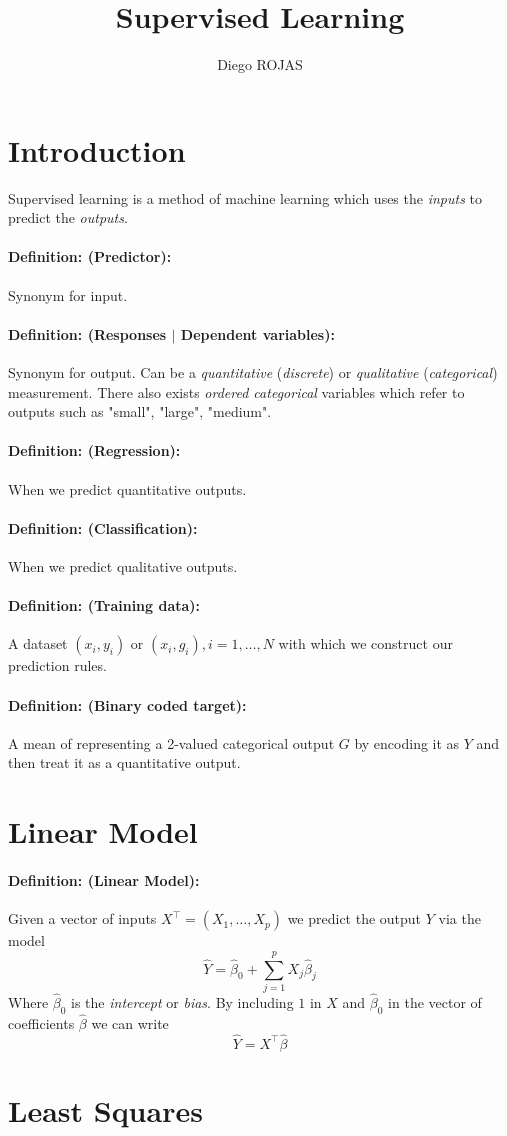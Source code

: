 \documentclass[12pt]{article}
\title{Supervised Learning}
\author{Diego ROJAS}
\newcommand{\xdefinition}[2]{\paragraph{\colorbox{#1!30}{\textbf{Definition:}} (#2):}}
\begin{document}
\maketitle

\section{Introduction}

Supervised learning is a method of machine learning which uses the \textit{inputs} to predict the \textit{outputs}.

\xdefinition{red}{Predictor} Synonym for input.

\xdefinition{red}{Responses $|$ Dependent variables} Synonym for output. Can be a \textit{quantitative} (\textit{discrete}) or \textit{qualitative} (\textit{categorical}) measurement. There also exists \textit{ordered categorical} variables which refer to outputs such as "small", "large", "medium".

\xdefinition{red}{Regression} When we predict quantitative outputs.

\xdefinition{red}{Classification} When we predict qualitative outputs.

\xdefinition{red}{Training data} A dataset $(x_i, y_i)$ or $(x_i, g_i), i = 1, \dots, N$ with which we construct our prediction rules.

\xdefinition{red}{Binary coded target} A mean of representing a 2-valued categorical output $G$ by encoding it as $Y$ and then treat it as a quantitative output.

\section{Linear Model}

\xdefinition{red}{Linear Model} Given a vector of inputs $X^\top = (X_1, \dots, X_p)$ we predict the output $Y$ via the model
%
\begin{equation}
	\hat{Y} = \hat{\beta}_0 + \sum\limits_{j=1}^{p} X_j \hat{\beta}_j
\end{equation}
%
Where $\hat{\beta}_0$ is the \textit{intercept} or \textit{bias}. By including $1$ in $X$ and $\hat{\beta}_0$ in the vector of coefficients $\hat{\beta}$ we can write
%
\begin{equation}
	\hat{Y} = X^\top \hat{\beta}
\end{equation}

\section{Least Squares}
\end{document}
